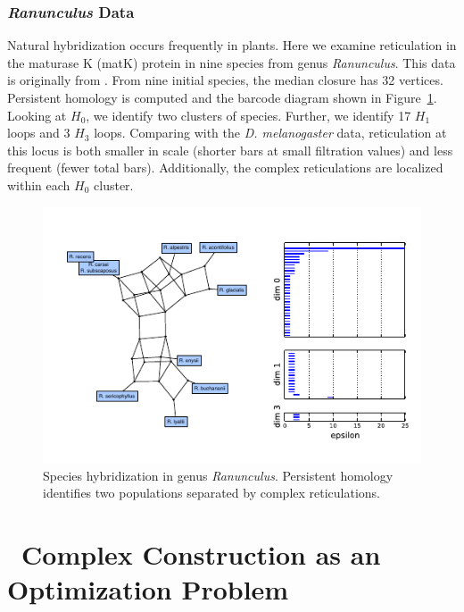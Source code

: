 \subsubsection{{\textit{Ranunculus}} Data}

Natural hybridization occurs frequently in plants.
Here we examine reticulation in the maturase K (matK) protein in nine species from genus \emph{Ranunculus}.
This data is originally from \cite{Huber:2001vv}.
From nine initial species, the median closure has 32 vertices.
Persistent homology is computed and the barcode diagram shown in Figure~\ref{fig:buttercup}.
Looking at $H_0$, we identify two clusters of species.
Further, we identify 17 $H_1$ loops and 3 $H_3$ loops.
Comparing with the \emph{D. melanogaster} data, reticulation at this locus is both smaller in scale (shorter bars at small filtration values) and less frequent (fewer total bars).
Additionally, the complex reticulations are localized within each $H_0$ cluster.

\begin{figure}
\centering
\includegraphics[width=\columnwidth]{fig/complex_construction/buttercup.pdf}
\caption[Species hybridization in genus \emph{Ranunculus}]{Species hybridization in genus \emph{Ranunculus}. Persistent homology identifies two populations separated by complex reticulations.}
\label{fig:buttercup}
\end{figure}

\section{\Cech\ Complex Construction as an Optimization Problem}
\label{complex_construction:cech_complex}

